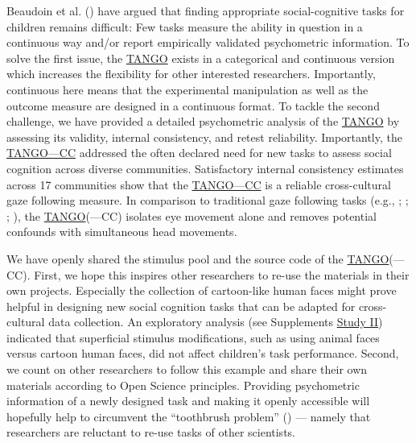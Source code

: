 \documentclass[
]{scrbook}
\begin{document}
Beaudoin et al. () have argued that finding appropriate social-cognitive tasks for children remains difficult: Few tasks measure the ability in question in a continuous way and/or report empirically validated psychometric information. To solve the first issue, the \hyperref[acronyms_TANGO]{TANGO} exists in a categorical and continuous version which increases the flexibility for other interested researchers. Importantly, continuous here means that the experimental manipulation as well as the outcome measure are designed in a continuous format. To tackle the second challenge, we have provided a detailed psychometric analysis of the \hyperref[acronyms_TANGO]{TANGO} by assessing its validity, internal consistency, and retest reliability. Importantly, the \hyperref[acronyms_TANGOux2014CC]{TANGO---CC} addressed the often declared need for new tasks to assess social cognition across diverse communities. Satisfactory internal consistency estimates across 17 communities show that the \hyperref[acronyms_TANGOux2014CC]{TANGO---CC} is a reliable cross-cultural gaze following measure. In comparison to traditional gaze following tasks (e.g., ; ; ; ), the \hyperref[acronyms_TANGO]{TANGO}(---CC) isolates eye movement alone and removes potential confounds with simultaneous head movements.

We have openly shared the stimulus pool and the source code of the \hyperref[acronyms_TANGO]{TANGO}(---CC). First, we hope this inspires other researchers to re-use the materials in their own projects. Especially the collection of cartoon-like human faces might prove helpful in designing new social cognition tasks that can be adapted for cross-cultural data collection. An exploratory analysis (see Supplements \hyperref[studyII]{Study II}) indicated that superficial stimulus modifications, such as using animal faces versus cartoon human faces, did not affect children's task performance. Second, we count on other researchers to follow this example and share their own materials according to Open Science principles. Providing psychometric information of a newly designed task and making it openly accessible will hopefully help to circumvent the ``toothbrush problem'' () --- namely that researchers are reluctant to re-use tasks of other scientists.
\end{document}
